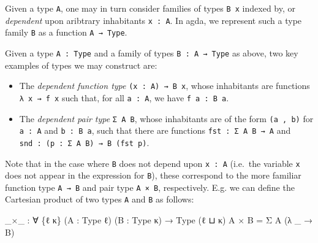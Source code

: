 \documentclass[
  11pt,
  oneside,
  article]{memoir}
\newenvironment{Shaded}{}{}
\newcommand{\NormalTok}[1]{#1}
\newcommand{\OtherTok}[1]{\textcolor[rgb]{0.00,0.44,0.13}{#1}}
\providecommand{\tightlist}{%
  \setlength{\itemsep}{0pt}\setlength{\parskip}{0pt}}
\theoremstyle{definition}
\theoremstyle{plain}
\newcommand{\0}{\textsf{0}}
\newcommand{\1}{\tn{\textsf{1}}}
\begin{document}
Given a type \texttt{A}, one may in turn consider families of types
\texttt{B\ x} indexed by, or \emph{dependent} upon aribtrary inhabitants
\texttt{x\ :\ A}. In agda, we represent such a type family \texttt{B} as
a function \texttt{A\ →\ Type}.

Given a type \texttt{A\ :\ Type} and a family of types
\texttt{B\ :\ A\ →\ Type} as above, two key examples of types we may
construct are:

\begin{itemize}
\tightlist
\item
  The \emph{dependent function type} \texttt{(x\ :\ A)\ →\ B\ x}, whose
  inhabitants are functions \texttt{λ\ x\ →\ f\ x} such that, for all
  \texttt{a\ :\ A}, we have \texttt{f\ a\ :\ B\ a}.
\item
  The \emph{dependent pair type} \texttt{Σ\ A\ B}, whose inhabitants are
  of the form \texttt{(a\ ,\ b)} for \texttt{a\ :\ A} and
  \texttt{b\ :\ B\ a}, such that there are functions
  \texttt{fst\ :\ Σ\ A\ B\ →\ A} and
  \texttt{snd\ :\ (p\ :\ Σ\ A\ B)\ →\ B\ (fst\ p)}.
\end{itemize}

Note that in the case where \texttt{B} does not depend upon
\texttt{x\ :\ A} (i.e.~the variable \texttt{x} does not appear in the
expression for \texttt{B}), these correspond to the more familiar
function type \texttt{A\ →\ B} and pair type \texttt{A\ ×\ B},
respectively. E.g. we can define the Cartesian product of two types
\texttt{A} and \texttt{B} as follows:

\begin{Shaded}
\begin{Highlighting}[]
\OtherTok{\_}\NormalTok{×}\OtherTok{\_} \OtherTok{:} \OtherTok{∀} \OtherTok{\{}\NormalTok{ℓ κ}\OtherTok{\}} \OtherTok{(}\NormalTok{A }\OtherTok{:}\NormalTok{ Type ℓ}\OtherTok{)} \OtherTok{(}\NormalTok{B }\OtherTok{:}\NormalTok{ Type κ}\OtherTok{)} \OtherTok{→}\NormalTok{ Type }\OtherTok{(}\NormalTok{ℓ ⊔ κ}\OtherTok{)}
\NormalTok{A × B }\OtherTok{=}\NormalTok{ Σ A }\OtherTok{(λ} \OtherTok{\_} \OtherTok{→}\NormalTok{ B}\OtherTok{)}
\end{Highlighting}
\end{Shaded}
\end{document}
